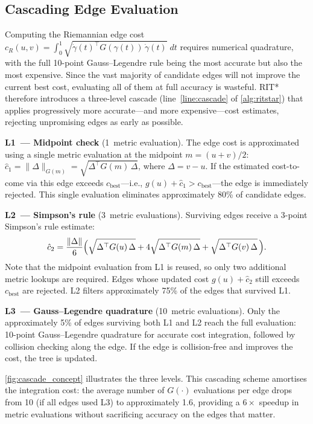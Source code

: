 \documentclass[journal]{IEEEtran}
\begin{document}
\subsection{Cascading Edge Evaluation}\label{sec:cascade}

Computing the Riemannian edge cost
$c_R(u,v) = \int_0^1 \sqrt{\dot\gamma(t)^\top G(\gamma(t))\,
\dot\gamma(t)}\;dt$
requires numerical quadrature, with the full 10-point
Gauss--Legendre rule being the most accurate but also the most
expensive.
Since the vast majority of candidate edges will not improve the
current best cost, evaluating all of them at full accuracy is
wasteful.
RIT* therefore introduces a three-level cascade
(line~\ref{line:cascade} of \cref{alg:ritstar}) that applies
progressively more accurate---and more expensive---cost estimates,
rejecting unpromising edges as early as possible.

\textbf{L1~--- Midpoint check} (1~metric evaluation).
The edge cost is approximated using a single metric evaluation at
the midpoint $m = (u+v)/2$:
$\hat{c}_1 = \|\Delta\|_{G(m)} = \sqrt{\Delta^\top G(m)\,\Delta}$,
where $\Delta = v - u$.
If the estimated cost-to-come via this edge exceeds
$c_{\mathrm{best}}$---i.e.,
$g(u) + \hat{c}_1 > c_{\mathrm{best}}$---the edge is immediately
rejected.
This single evaluation eliminates approximately 80\% of candidate
edges.

\textbf{L2~--- Simpson's rule} (3~metric evaluations).
Surviving edges receive a 3-point Simpson's rule estimate:
\begin{equation}\label{eq:simpson}
  \hat{c}_2 = \frac{\|\Delta\|}{6}\Bigl(
    \sqrt{\Delta^\top G(u)\,\Delta}
    + 4\sqrt{\Delta^\top G(m)\,\Delta}
    + \sqrt{\Delta^\top G(v)\,\Delta}\,\Bigr).
\end{equation}
Note that the midpoint evaluation from L1 is reused, so only two
additional metric lookups are required.
Edges whose updated cost $g(u) + \hat{c}_2$ still
exceeds~$c_{\mathrm{best}}$ are rejected.
L2 filters approximately 75\% of the edges that survived L1.

\textbf{L3~--- Gauss--Legendre quadrature} (10~metric evaluations).
Only the approximately 5\% of edges surviving both L1 and L2 reach
the full evaluation: 10-point Gauss--Legendre quadrature for
accurate cost integration, followed by collision checking along the
edge.
If the edge is collision-free and improves the cost, the tree is
updated.

\cref{fig:cascade_concept} illustrates the three levels.
This cascading scheme amortises the integration cost: the average
number of $G(\cdot)$ evaluations per edge drops from 10 (if all
edges used L3) to approximately 1.6, providing a
$6\times$ speedup in metric evaluations without
sacrificing accuracy on the edges that matter.
\end{document}
